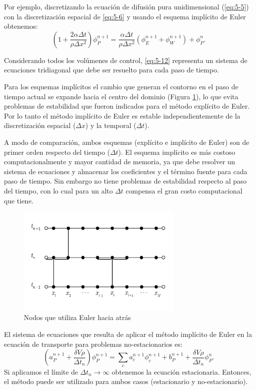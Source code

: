 \documentclass[a4paper,10pt, oneside]{book}
\begin{document}
Por ejemplo, discretizando la ecuación de difusión pura unidimensional (\ref{eq:5-5}) con la discretización espacial de \ref{eq:5-6} y usando el esquema implícito de Euler obtenemos:
\begin{equation}
	\left( 1 + \frac{2 \alpha \Delta t}{\rho \Delta x^2} \right) \phi_P^{n+1} = \frac{\alpha \Delta t}{\rho \Delta x^2} \left( \phi_E^{n+1} + \phi_W^{n+1} \right) + \phi_P^n.
	\label{eq:5-12}
\end{equation}

Considerando todos los volúmenes de control, \ref{eq:5-12} representa un sistema de ecuaciones tridiagonal que debe ser resuelto para cada paso de tiempo.

Para los esquemas implícitos el cambio que generan el contorno en el paso de tiempo actual se expande hacia el centro del dominio (Figura \ref{img:5-8}), lo que evita problemas de estabilidad que fueron indicados para el método explícito de Euler. Por lo tanto el método implícito de Euler es estable independientemente de la discretización espacial ($\Delta x$) y la temporal ($\Delta t$).

A modo de comparación, ambos esquemas (explícito e implícito de Euler) son de primer orden respecto del tiempo ($\Delta t$). El esquema implícito es más costoso computacionalmente y mayor cantidad de memoria, ya que debe resolver un sistema de ecuaciones y almacenar los coeficientes y el término fuente para cada paso de tiempo. Sin embargo no tiene problemas de estabilidad respecto al paso del tiempo, con lo cual para un alto $\Delta t$ compensa el gran costo computacional que tiene.
\begin{figure}[h!]
	\centering
	\includegraphics[width=8cm]{Img/5-8}
	\caption{Nodos que utiliza Euler hacia atrás}
	\label{img:5-8}
\end{figure}

El sistema de ecuaciones que resulta de aplicar el método implícito de Euler en la ecuación de transporte para problemas no-estacionarios es:
\begin{equation}
	\left( a_P^{n+1} + \frac{\delta V \rho}{\Delta t_n} \right) \phi_P^{n+1} = \sum_c a_c^{n+1} \phi_c^{n+1} + b_P^{n+1} + \frac{\delta V \rho }{\Delta t_n} \phi_P^n. \nonumber
\end{equation}
Si aplicamos el límite de $\Delta t_n \longrightarrow \infty$ obtenemos la ecuación estacionaria. Entonces, el método puede ser utilizado para ambos casos (estacionario y no-estacionario).
\end{document}
